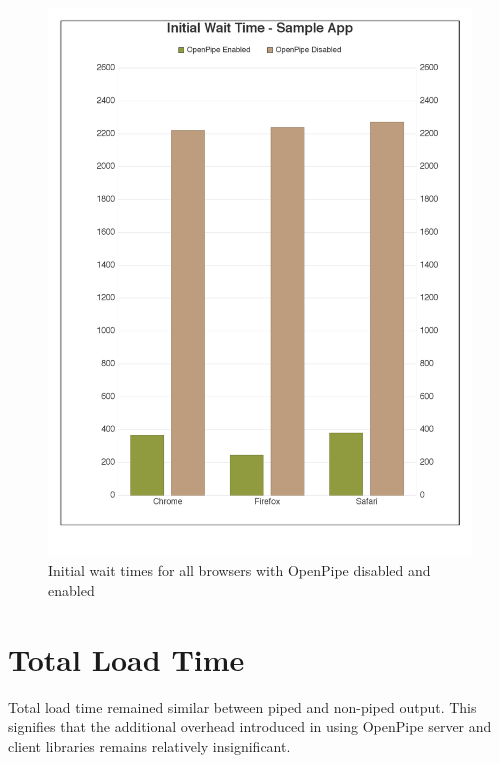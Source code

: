 \documentclass[12pt]{report}
\begin{document}
\begin{figure}[H]
\caption{Initial wait times for all browsers with OpenPipe disabled and enabled}
\label{fig:initialWaitTimesChart}
\centering
\includegraphics[width=\textwidth,keepaspectratio]{figures/images/initial_wait_time__sample_app_1.pdf}
\end{figure}


\section{Total Load Time}
Total load time remained similar between piped and non-piped output.  This signifies that the additional overhead introduced in using OpenPipe server and client libraries remains relatively insignificant.
\end{document}
